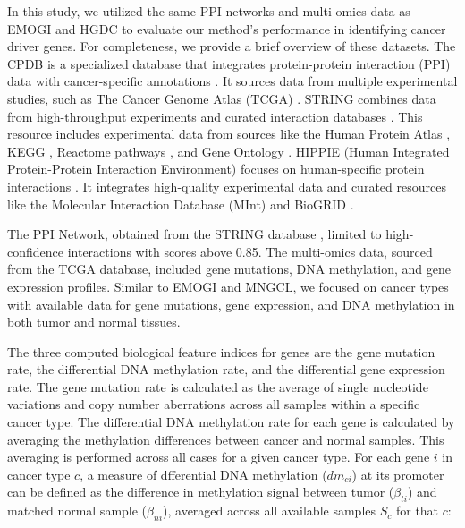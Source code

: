 In this study, we utilized the same PPI networks and multi-omics data as EMOGI and HGDC to evaluate our method's performance in identifying cancer driver genes. For completeness, we provide a brief overview of these datasets. 
The CPDB \cite{kamburov2011consensuspathdb} is a specialized database that integrates protein-protein interaction (PPI) data with cancer-specific annotations \cite{cpdb_citation}. It sources data from multiple experimental studies, such as The Cancer Genome Atlas (TCGA) \cite{tcga_citation}.
STRING combines data from high-throughput experiments and curated interaction databases \cite{string_citation}. This resource includes experimental data from sources like the Human Protein Atlas \cite{human_protein_atlas_citation}, KEGG \cite{kegg_citation}, Reactome pathways \cite{reactome_citation,wu2010human}, and Gene Ontology \cite{go_citation}.
HIPPIE (Human Integrated Protein-Protein Interaction Environment) focuses on human-specific protein interactions \cite{hippie_citation,alanis2017hippie,huang2018systematic,khurana2013interpretation}. It integrates high-quality experimental data and curated resources like the Molecular Interaction Database (MInt) \cite{mint_citation} and BioGRID \cite{biogrid_citation}.

The PPI Network, obtained from the STRING database \cite{szklarczyk2023string}, limited to high-confidence interactions with scores above 0.85. 
The multi-omics data, sourced from the TCGA database, included gene mutations, DNA methylation, and gene expression profiles. Similar to EMOGI and MNGCL, we focused on cancer types with available data for gene mutations, gene expression, and DNA methylation in both tumor and normal tissues. 

The three computed biological feature indices for genes are the gene mutation rate, the differential DNA methylation rate, and the differential gene expression rate. The gene mutation rate is calculated as the average of single nucleotide variations and copy number aberrations across all samples within a specific cancer type. The differential DNA methylation rate for each gene is calculated by averaging the methylation differences between cancer and normal samples. This averaging is performed across all cases for a given cancer type.
For each gene \(i\) in cancer type \(c\), a measure of dfferential DNA methylation (\(dm_{ci}\)) at its promoter can be defined as the difference in methylation signal between tumor (\(\beta_{ti}\)) and matched normal sample (\(\beta_{ni}\)), averaged across all available samples \(S_c\) for that \(c\):  

